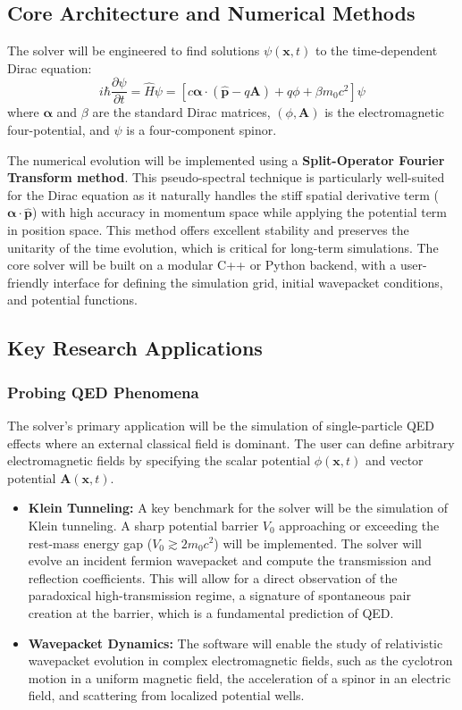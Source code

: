 \documentclass[11pt, letterpaper]{article}
\theoremstyle{definition}
\theoremstyle{remark}
\begin{document}
\subsection{Core Architecture and Numerical Methods}

The solver will be engineered to find solutions $\psi(\mathbf{x}, t)$ to the
time-dependent Dirac equation:
\[
	i\hbar \frac{\partial \psi}{\partial t} = \hat{H}\psi = \left[
	c\boldsymbol{\alpha} \cdot (\hat{\mathbf{p}} - q\mathbf{A}) + q\phi + \beta
m_0 c^2 \right] \psi
\]
where $\boldsymbol{\alpha}$ and $\beta$ are the standard Dirac matrices, $(\phi,
\mathbf{A})$ is the electromagnetic four-potential, and $\psi$ is a
four-component spinor.

The numerical evolution will be implemented using a \textbf{Split-Operator
Fourier Transform method}. This pseudo-spectral technique is particularly
well-suited for the Dirac equation as it naturally handles the stiff spatial
derivative term ($\boldsymbol{\alpha} \cdot \hat{\mathbf{p}}$) with high
accuracy in momentum space while applying the potential term in position space.
This method offers excellent stability and preserves the unitarity of the time
evolution, which is critical for long-term simulations. The core solver will be
built on a modular C++ or Python backend, with a user-friendly interface for
defining the simulation grid, initial wavepacket conditions, and potential
functions.

\subsection{Key Research Applications}

\subsubsection{Probing QED Phenomena}

The solver's primary application will be the simulation of single-particle QED
effects where an external classical field is dominant. The user can define
arbitrary electromagnetic fields by specifying the scalar potential
$\phi(\mathbf{x}, t)$ and vector potential $\mathbf{A}(\mathbf{x}, t)$.
\begin{itemize}
	\item \textbf{Klein Tunneling:} A key benchmark for the solver will be the
		simulation of Klein tunneling. A sharp potential barrier $V_0$ approaching
		or exceeding the rest-mass energy gap ($V_0 \gtrsim 2m_0c^2$) will be
		implemented. The solver will evolve an incident fermion wavepacket and
		compute the transmission and reflection coefficients. This will allow for a
		direct observation of the paradoxical high-transmission regime, a signature
		of spontaneous pair creation at the barrier, which is a fundamental
		prediction of QED.
	\item \textbf{Wavepacket Dynamics:} The software will enable the study of
		relativistic wavepacket evolution in complex electromagnetic fields, such as
		the cyclotron motion in a uniform magnetic field, the acceleration of a
		spinor in an electric field, and scattering from localized potential wells.
\end{itemize}
\end{document}
